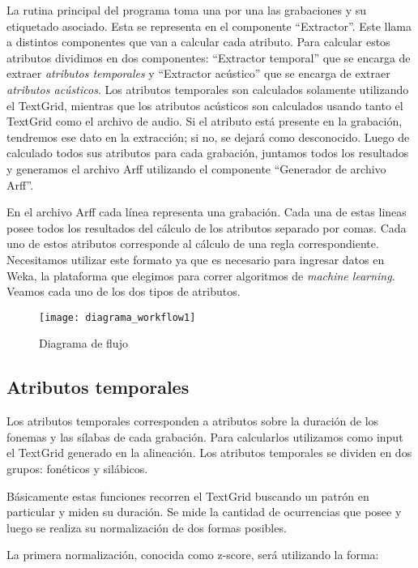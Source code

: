 La rutina principal del programa toma una por una las grabaciones y su etiquetado asociado. Esta se representa en el componente ``Extractor''. Este llama a distintos componentes que van a calcular cada atributo. Para calcular estos atributos dividimos en dos componentes: ``Extractor temporal'' que se encarga de extraer \textit{atributos temporales} y ``Extractor acústico'' que se encarga de extraer \textit{atributos acústicos}. Los atributos temporales son calculados solamente utilizando el TextGrid, mientras que los atributos acústicos son calculados usando tanto el TextGrid como el archivo de audio. Si el atributo está presente en la grabación, tendremos ese dato en la extracción; si no, se dejará como desconocido. Luego de calculado todos sus atributos para cada grabación, juntamos todos los resultados y generamos el archivo Arff utilizando el componente ``Generador de archivo Arff''.

En el archivo Arff cada línea representa una grabación.  Cada una de estas lineas posee todos los resultados del cálculo de los atributos separado por comas. Cada uno de estos atributos corresponde al cálculo de una regla correspondiente. Necesitamos utilizar este formato ya que es necesario para ingresar datos en Weka, la plataforma que elegimos para correr algoritmos de \textit{machine learning}. Veamos cada uno de los dos tipos de atributos.

\begin{figure}[h!]
    \centerline{\texttt{[image: diagrama\_workflow1]} }
    \caption{Diagrama de flujo}
    \label{workflow}
\end{figure}

\subsection{Atributos temporales}

Los atributos temporales corresponden a atributos sobre la duración de los fonemas y las sílabas de cada grabación. Para calcularlos utilizamos como input el TextGrid generado en la alineación. Los atributos temporales se dividen en dos grupos: fonéticos y silábicos. 

Básicamente estas funciones recorren el TextGrid buscando un patrón en particular y miden su duración. Se mide la cantidad de ocurrencias que posee y luego se realiza su normalización de dos formas posibles. 

La primera normalización, conocida como z-score, será utilizando la forma:

